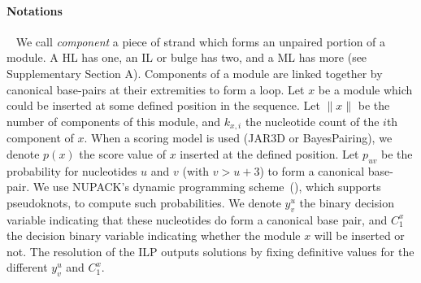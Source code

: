\documentclass{bioinfo}
\begin{document}
\begin{methods}
\paragraph{Notations} ~ We call \textit{component} a piece of strand which forms an unpaired portion of a module. A HL has one, an IL or bulge has two, and a ML has more (see Supplementary Section A). Components of a module are linked together by canonical base-pairs at their extremities to form a loop. Let $x$ be a module which could be inserted at some defined position in the sequence. Let $\|x\|$ be the number of components of this module, and $k_{x,i}$ the nucleotide count of the $i$th component of $x$. When a scoring model is used (JAR3D or BayesPairing), we denote $p(x)$ the score value of $x$ inserted at the defined position. Let $p_{uv}$ be the probability for nucleotides $u$ and $v$ (with $v>u+3$) to form a canonical base-pair. We use NUPACK's dynamic programming scheme~(\citealp{dirksAlgorithmComputingNucleic2004}), which supports pseudoknots, to compute such probabilities. We denote $y^u_v$ the binary decision variable indicating that these nucleotides do form a canonical base pair, and $C^x_1$ the decision binary variable indicating whether the module $x$ will be inserted or not. The resolution of the ILP outputs solutions by fixing definitive values for the different $y^u_v$ and $C^x_1$. 


\end{methods}
\end{document}

